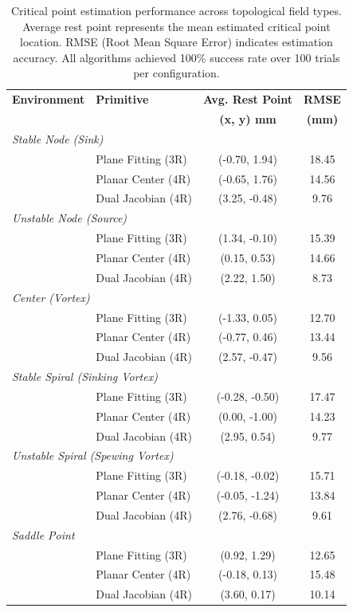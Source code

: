 \documentclass[lettersize,journal]{IEEEtran}
\begin{document}
\begin{table}[h]
\centering
\begin{tabular}{llcc}
\hline
\textbf{Environment} & \textbf{Primitive} & \textbf{Avg. Rest Point} & \textbf{RMSE} \\
 & & \textbf{(x, y) mm} & \textbf{(mm)} \\
\hline
\multicolumn{4}{l}{\textit{Stable Node (Sink)}} \\
\hline
 & Plane Fitting (3R) & (-0.70, 1.94) & 18.45 \\
 & Planar Center (4R) & (-0.65, 1.76) & 14.56 \\
 & Dual Jacobian (4R) & (3.25, -0.48) & 9.76 \\
\hline
\multicolumn{4}{l}{\textit{Unstable Node (Source)}} \\
\hline
 & Plane Fitting (3R) & (1.34, -0.10) & 15.39 \\
 & Planar Center (4R) & (0.15, 0.53) & 14.66 \\
 & Dual Jacobian (4R) & (2.22, 1.50) & 8.73 \\
\hline
\multicolumn{4}{l}{\textit{Center (Vortex)}} \\
\hline
 & Plane Fitting (3R) & (-1.33, 0.05) & 12.70 \\
 & Planar Center (4R) & (-0.77, 0.46) & 13.44 \\
 & Dual Jacobian (4R) & (2.57, -0.47) & 9.56 \\
\hline
\multicolumn{4}{l}{\textit{Stable Spiral (Sinking Vortex)}} \\
\hline
 & Plane Fitting (3R) & (-0.28, -0.50) & 17.47 \\
 & Planar Center (4R) & (0.00, -1.00) & 14.23 \\
 & Dual Jacobian (4R) & (2.95, 0.54) & 9.77 \\
\hline
\multicolumn{4}{l}{\textit{Unstable Spiral (Spewing Vortex)}} \\
\hline
 & Plane Fitting (3R) & (-0.18, -0.02) & 15.71 \\
 & Planar Center (4R) & (-0.05, -1.24) & 13.84 \\
 & Dual Jacobian (4R) & (2.76, -0.68) & 9.61 \\
\hline
\multicolumn{4}{l}{\textit{Saddle Point}} \\
\hline
 & Plane Fitting (3R) & (0.92, 1.29) & 12.65 \\
 & Planar Center (4R) & (-0.18, 0.13) & 15.48 \\
 & Dual Jacobian (4R) & (3.60, 0.17) & 10.14 \\
\hline
\end{tabular}
\caption{Critical point estimation performance across topological field types. Average rest point represents the mean estimated critical point location. RMSE (Root Mean Square Error) indicates estimation accuracy. All algorithms achieved 100\% success rate over 100 trials per configuration.}
\label{tab:estimation_results}
\end{table}
\end{document}
